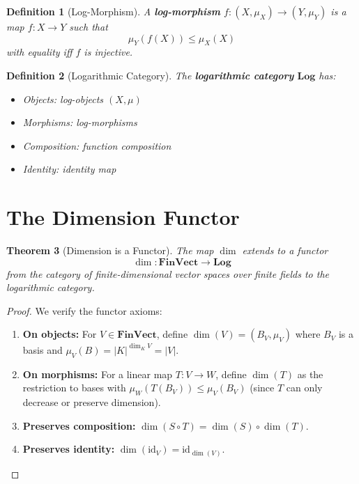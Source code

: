 \documentclass[11pt]{article}
\newtheorem{definition}{Definition}[section]
\newtheorem{theorem}[definition]{Theorem}
\begin{document}
\begin{definition}[Log-Morphism]
A \textbf{log-morphism} $f: (X, \mu_X) \to (Y, \mu_Y)$ is a map $f: X \to Y$ such that
\[
\mu_Y(f(X)) \leq \mu_X(X)
\]
with equality iff $f$ is injective.
\end{definition}

\begin{definition}[Logarithmic Category]
The \textbf{logarithmic category} $\mathbf{Log}$ has:
\begin{itemize}
\item Objects: log-objects $(X, \mu)$
\item Morphisms: log-morphisms
\item Composition: function composition
\item Identity: identity map
\end{itemize}
\end{definition}

\section{The Dimension Functor}
\label{sec:functor}

\begin{theorem}[Dimension is a Functor]
The map $\dim$ extends to a functor
\[
\dim: \mathbf{FinVect} \to \mathbf{Log}
\]
from the category of finite-dimensional vector spaces over finite fields to the logarithmic category.
\end{theorem}

\begin{proof}
We verify the functor axioms:
\begin{enumerate}
\item \textbf{On objects:} For $V \in \mathbf{FinVect}$, define $\dim(V) = (B_V, \mu_V)$ where $B_V$ is a basis and $\mu_V(B) = |K|^{\dim_K V} = |V|$.

\item \textbf{On morphisms:} For a linear map $T: V \to W$, define $\dim(T)$ as the restriction to bases with $\mu_W(T(B_V)) \leq \mu_V(B_V)$ (since $T$ can only decrease or preserve dimension).

\item \textbf{Preserves composition:} $\dim(S \circ T) = \dim(S) \circ \dim(T)$.

\item \textbf{Preserves identity:} $\dim(\text{id}_V) = \text{id}_{\dim(V)}$.
\end{enumerate}
\end{proof}
\end{document}
